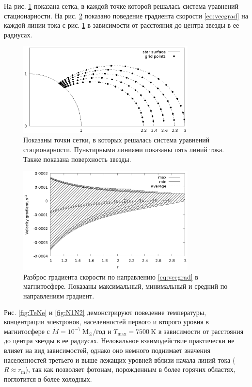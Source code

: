 \documentclass[12pt]{article}
\begin{document}
На рис. \ref{fig:grid} показана сетка, в каждой точке которой решалась система уравнений стационарности. На рис. \ref{fig:grad} показано поведение градиента скорости \eqref{eq:vecgrad} на каждой линии тока с рис. \ref{fig:grid} в зависимости от расстояния до центра звезды в ее радиусах.
\begin{figure}[!h]
\centering
\includegraphics[width=0.8\textwidth]{grid.eps}
\caption{Показаны точки сетки, в которых решалась система уравнений стационарности. Пунктирными линиями показаны пять линий тока. Также показана поверхность звезды.}
\label{fig:grid}
\end{figure}
\begin{figure}[!h]
\centering
\includegraphics[width=0.8\textwidth]{grad.eps}
\caption{Разброс градиента скорости по направлению \eqref{eq:vecgrad} в магнитосфере. Показаны максимальный, минимальный и средний по направлениям градиент.}
\label{fig:grad}
\end{figure}

\FloatBarrier

Рис. \ref{fig:TeNe} и \ref{fig:N1N2} демонстрируют поведение температуры, концентрации электронов, населенностей первого и второго уровня в магнитосфере с $\dot{M} = 10^{-7}\ \text{M}_\odot/$год и $T_\text{max} = 7500\ \text{K}$ в зависимости от расстояния до центра звезды в ее радиусах. Нелокальное взаимодействие практически не влияет на вид зависимостей, однако оно немного поднимает значения населенностей третьего и выше лежащих уровней вблизи начала линий тока ($R \approx r_\text{m}$), так как позволяет фотонам, порожденным в более горячих областях, поглотится в более холодных.
\end{document}
